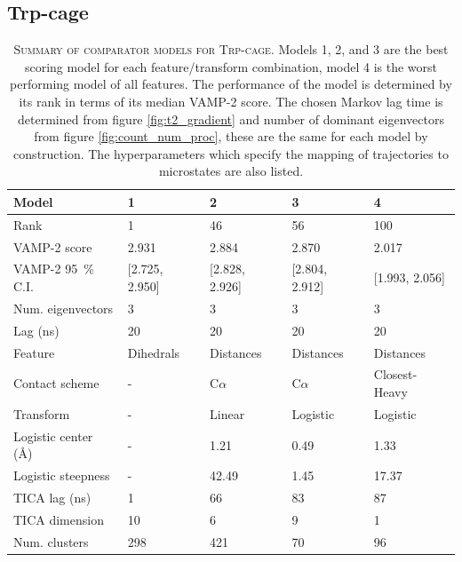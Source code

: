 \documentclass{article}
\begin{document}
\clearpage
\subsection{Trp-cage}

\begin{table}[h]
    \centering
    \begin{tabular}{lllll}
    \toprule
    Model &               1 &               2 &               3 &               4 \\
    \midrule
    Rank                             &               1 &              46 &              56 &             100 \\
    VAMP-2 score                     &           2.931 &           2.884 &           2.870 &           2.017 \\
    VAMP-2 \SI{95}{\percent} C.I.    &  [2.725, 2.950] &  [2.828, 2.926] &  [2.804, 2.912] &  [1.993, 2.056] \\
    Num. eigenvectors                &               3 &               3 &               3 &               3 \\
    Lag (ns)                         &              20 &              20 &              20 &              20 \\
    Feature                          &       Dihedrals &       Distances &       Distances &       Distances \\
    Contact scheme                   &               - &       C$\alpha$ &       C$\alpha$ &   Closest-Heavy \\
    Transform                        &               - &          Linear &        Logistic &        Logistic \\
    Logistic center (\si{\angstrom}) &               - &            1.21 &            0.49 &            1.33 \\
    Logistic steepness               &               - &           42.49 &            1.45 &           17.37 \\
    TICA lag (ns)                    &               1 &              66 &              83 &              87 \\
    TICA dimension                   &              10 &               6 &               9 &               1 \\
    Num. clusters                    &             298 &             421 &              70 &              96 \\
    \bottomrule
    \end{tabular}
    \caption{\textsc{Summary of comparator models for Trp-cage.} Models 1, 2, and 3 are the best scoring model for each feature/transform combination, model 4 is the worst performing model of all features.  The performance of the model is determined by its rank in terms of its median VAMP-2 score.  The chosen Markov lag time is determined from figure \ref{fig:t2_gradient} and number of dominant eigenvectors from figure \ref{fig:count_num_proc}, these are the same for each model by construction. The hyperparameters which specify the mapping of trajectories to microstates are also listed.}
    \label{tab:2jof_mod_defs}
\end{table}
\end{document}
